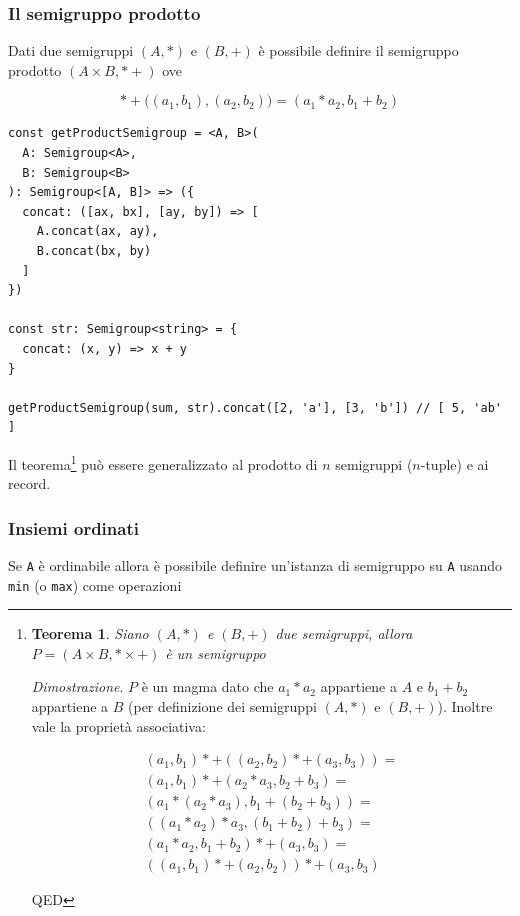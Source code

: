 \documentclass[12pt]{article}
\newtheorem{theorem}{Teorema}
\begin{document}
\subsubsection{Il semigruppo prodotto}

Dati due semigruppi $(A, *)$ e $(B, +)$ è possibile definire il semigruppo prodotto $(A \times B, *+)$ ove

$$
*+\Big((a_1, b_1), (a_2, b_2)\Big) = (a_1 * a_2, b_1 + b_2)
$$

\begin{verbatim}
const getProductSemigroup = <A, B>(
  A: Semigroup<A>,
  B: Semigroup<B>
): Semigroup<[A, B]> => ({
  concat: ([ax, bx], [ay, by]) => [
    A.concat(ax, ay),
    B.concat(bx, by)
  ]
})

const str: Semigroup<string> = {
  concat: (x, y) => x + y
}

getProductSemigroup(sum, str).concat([2, 'a'], [3, 'b']) // [ 5, 'ab' ]
\end{verbatim}

Il teorema\footnote{
\begin{theorem}
Siano $(A, *)$ e $(B, +)$ due semigruppi, allora $P = (A \times B, * \times +)$ è un semigruppo
\end{theorem}

\emph{Dimostrazione}. $P$ è un magma dato che $a_1 * a_2$ appartiene a $A$ e $b_1 + b_2$ appartiene a $B$ (per definizione dei semigruppi $(A, *)$ e $(B, +)$).
Inoltre vale la proprietà associativa:

\begin{eqnarray}
(a_1, b_1) *+ ((a_2, b_2) *+ (a_3, b_3)) = \\
(a_1, b_1) *+ (a_2 * a_3, b_2 + b_3) = \\
(a_1 * (a_2 * a_3), b_1 + (b_2 + b_3)) = \\
((a_1 * a_2) * a_3, (b_1 + b_2) + b_3) = \\
(a_1 * a_2, b_1 + b_2) *+ (a_3, b_3) = \\
((a_1, b_1) *+ (a_2, b_2)) *+ (a_3, b_3)
\end{eqnarray}

QED

} può essere generalizzato al prodotto di $n$ semigruppi ($n$-tuple) e ai record.

\subsubsection{Insiemi ordinati}

Se \texttt{A} è ordinabile allora è possibile definire un'istanza di semigruppo su \texttt{A} usando \texttt{min} (o \texttt{max}) come operazioni
\end{document}

